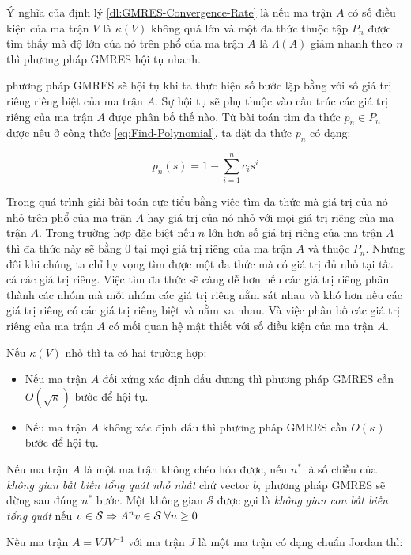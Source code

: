 \documentclass[14pt, a4paper]{article}
\numberwithin{equation}{section}
\numberwithin{algorithm}{section}
\numberwithin{figure}{section}
\numberwithin{dl}{section}
\numberwithin{md}{section}
\numberwithin{bd}{section}
\numberwithin{dn}{section}
\begin{document}
Ý nghĩa của định lý \ref{dl:GMRES-Convergence-Rate} là nếu ma trận $A$ có số điều kiện của ma trận $V$ là $\kappa(V)$ không quá lớn và một đa thức thuộc tập $P_n$ được tìm thấy mà độ lớn của nó trên phổ của ma trận $A$ là $\Lambda(A)$ giảm nhanh theo $n$ thì phương pháp GMRES hội tụ nhanh.

phương pháp GMRES sẽ hội tụ khi ta thực hiện số bước lặp bằng với số giá trị riêng riêng biệt của ma trận $A$. Sự hội tụ sẽ phụ thuộc vào cấu trúc các giá trị riêng của ma trận $A$ được phân bố thế nào.
Từ bài toán tìm đa thức $p_n \in P_n$ được nêu ở công thức \ref{eq:Find-Polynomial}, ta đặt đa thức $p_n$ có dạng:

\begin{equation}
    p_n(s) = 1 - \sum_{i=1}^n c_i s^i
\end{equation}

Trong quá trình giải bài toán cực tiểu bằng việc tìm đa thức mà giá trị của nó nhỏ trên phổ của ma trận $A$ hay giá trị của nó nhỏ với mọi giá trị riêng của ma trận $A$. Trong trường hợp đặc biệt nếu $n$ lớn hơn số giá trị riêng của ma trận $A$ thì đa thức này sẽ bằng 0 tại mọi giá trị riêng của ma trận $A$ và thuộc $P_n$.
Nhưng đôi khi chúng ta chỉ hy vọng tìm được một đa thức mà có giá trị đủ nhỏ tại tất cả các giá trị riêng. Việc tìm đa thức sẽ càng dễ hơn nếu các giá trị riêng phân thành các nhóm mà mỗi nhóm các giá trị riêng nằm sát nhau và khó hơn nếu các giá trị riêng có các giá trị riêng biệt và nằm xa nhau. Và việc phân bố các giá trị riêng của ma trận $A$ có mối quan hệ mật thiết với số điều kiện của ma trận $A$.

Nếu $\kappa(V)$ nhỏ thì ta có hai trường hợp:
\begin{itemize}
    \item Nếu ma trận $A$ đối xứng xác định dấu dương thì phương pháp GMRES cần $O(\sqrt{\kappa})$ bước để hội tụ.
    \item Nếu ma trận $A$ không xác định dấu thì phương pháp GMRES cần $O(\kappa)$ bước để hội tụ.
\end{itemize}

Nếu ma trận $A$ là một ma trận không chéo hóa được, nếu $n^{*}$ là số chiều của \textit{không gian bất biến tổng quát nhỏ nhất} chứ vector $b$, phương pháp GMRES sẽ dừng sau đúng $n^{*}$ bước. Một không gian $\mathcal{S}$ được gọi là \textit{không gian con bất biến tổng quát} nếu $v \in \mathcal{S} \Rightarrow A^{n}v \in \mathcal{S} \thickspace \forall n \geq 0$ 

Nếu ma trận $A=VJV^{-1}$ với ma trận $J$ là một ma trận có dạng chuẩn Jordan thì:
\end{document}
